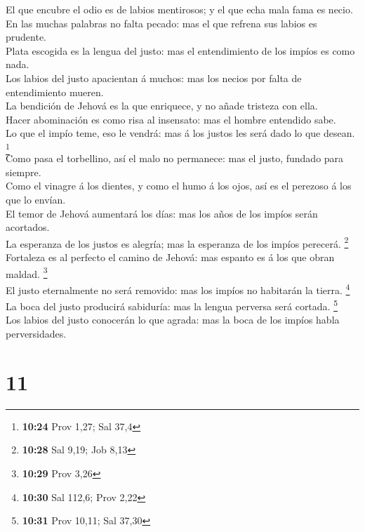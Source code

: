  El que encubre el odio es de labios mentirosos; y el que
echa mala fama es necio.\\
 En las muchas palabras no falta pecado: mas el que refrena
sus labios es prudente.\\
 Plata escogida es la lengua del justo: mas el
entendimiento de los impíos es como nada.\\
 Los labios del justo apacientan á muchos: mas los necios
por falta de entendimiento mueren.\\
 La bendición de Jehová es la que enriquece, y no añade
tristeza con ella.\\
 Hacer abominación es como risa al insensato: mas el hombre
entendido sabe.\\
 Lo que el impío teme, eso le vendrá: mas á los justos les
será dado lo que desean. \footnote{\textbf{10:24} Prov 1,27; Sal 37,4}\\
 Como pasa el torbellino, así el malo no permanece: mas el
justo, fundado para siempre.\\
 Como el vinagre á los dientes, y como el humo á los ojos,
así es el perezoso á los que lo envían.\\
 El temor de Jehová aumentará los días: mas los años de los
impíos serán acortados.\\
 La esperanza de los justos es alegría; mas la esperanza de
los impíos perecerá. \footnote{\textbf{10:28} Sal 9,19; Job 8,13}\\
 Fortaleza es al perfecto el camino de Jehová: mas espanto
es á los que obran maldad. \footnote{\textbf{10:29} Prov 3,26}\\
 El justo eternalmente no será removido: mas los impíos no
habitarán la tierra. \footnote{\textbf{10:30} Sal 112,6; Prov 2,22}\\
 La boca del justo producirá sabiduría: mas la lengua
perversa será cortada. \footnote{\textbf{10:31} Prov 10,11; Sal 37,30}\\
 Los labios del justo conocerán lo que agrada: mas la boca
de los impíos habla perversidades.

\hypertarget{section-10}{%
\section{11}\label{section-10}}

